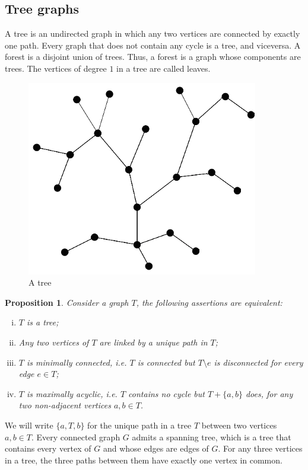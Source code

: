 \documentclass[10pt,a4paper]{book}
\numberwithin{equation}{chapter}
\numberwithin{figure}{chapter}
\numberwithin{table}{chapter}
\newtheorem{prop}{Proposition}[section]
\begin{document}
\subsection{Tree graphs} 
A tree is an undirected graph in which any two vertices are connected by exactly one path. Every graph that does not contain any cycle is a tree, and viceversa. A forest is a disjoint union of trees. Thus, a forest is a graph whose components are trees. The vertices of degree $1$ in a tree are called leaves.
\begin{figure}[H]
    \begin{center}
        \includegraphics[scale=0.5]{Tree.png}
    \end{center}
    \caption{\footnotesize A tree }
    \label{figtree}
\end{figure}
\begin{prop}
Consider a graph $T$, the following assertions are equivalent:
\begin{enumerate}[(i)]
\item $T$ is a tree;
\item Any two vertices of $T$ are linked by a unique path in $T$;
\item $T$ is minimally connected, i.e. $T$ is connected but $T\setminus e$ is disconnected for every edge $e \in T$;
\item $T$ is maximally acyclic, i.e. $T$ contains no cycle but $T + \lbrace a,b\rbrace$ does, for any two non-adjacent vertices $a,b \in T$.
\end{enumerate}
\end{prop} 
We will write $\lbrace a,T,b \rbrace$ for the unique path in a tree $T$ between two vertices $a,b \in T$. Every connected graph $G$ admits a spanning tree, which is a tree that contains every vertex of $G$ and whose edges are edges of $G$. For any three vertices in a tree, the three paths between them have exactly one vertex in common.
\end{document}

